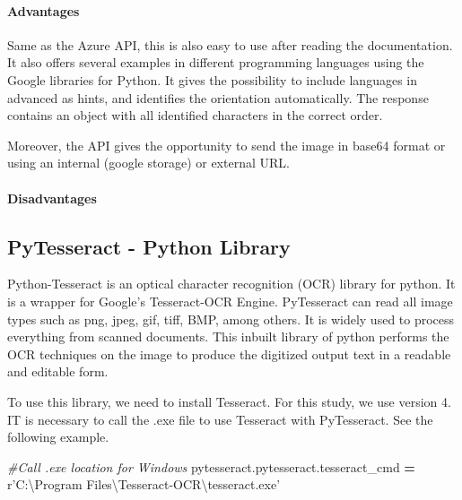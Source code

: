 \documentclass[
]{article}
\newenvironment{Shaded}{\begin{snugshade}}{\end{snugshade}}
\newcommand{\CommentTok}[1]{\textcolor[rgb]{0.56,0.35,0.01}{\textit{#1}}}
\newcommand{\NormalTok}[1]{#1}
\newcommand{\OperatorTok}[1]{\textcolor[rgb]{0.81,0.36,0.00}{\textbf{#1}}}
\newcommand{\VerbatimStringTok}[1]{\textcolor[rgb]{0.31,0.60,0.02}{#1}}
\begin{document}
\hypertarget{advantages-1}{%
\paragraph{Advantages}\label{advantages-1}}

Same as the Azure API, this is also easy to use after reading the
documentation. It also offers several examples in different programming
languages using the Google libraries for Python. It gives the
possibility to include languages in advanced as hints, and identifies
the orientation automatically. The response contains an object with all
identified characters in the correct order.

Moreover, the API gives the opportunity to send the image in base64
format or using an internal (google storage) or external URL.

\hypertarget{disadvantages-1}{%
\paragraph{Disadvantages}\label{disadvantages-1}}

\hypertarget{pytesseract---python-library}{%
\subsection{PyTesseract - Python
Library}\label{pytesseract---python-library}}

Python-Tesseract is an optical character recognition (OCR) library for
python. It is a wrapper for Google's Tesseract-OCR Engine. PyTesseract
can read all image types such as png, jpeg, gif, tiff, BMP, among
others. It is widely used to process everything from scanned documents.
This inbuilt library of python performs the OCR techniques on the image
to produce the digitized output text in a readable and editable form.

To use this library, we need to install Tesseract. For this study, we
use version 4. IT is necessary to call the .exe file to use Tesseract
with PyTesseract. See the following example.

\begin{Shaded}
\begin{Highlighting}[]
\CommentTok{#Call .exe location for Windows}
\NormalTok{pytesseract.pytesseract.tesseract_cmd }\OperatorTok{=} \VerbatimStringTok{r'C:\textbackslash{}Program Files\textbackslash{}Tesseract-OCR\textbackslash{}tesseract.exe'} 
\end{Highlighting}
\end{Shaded}
\end{document}
